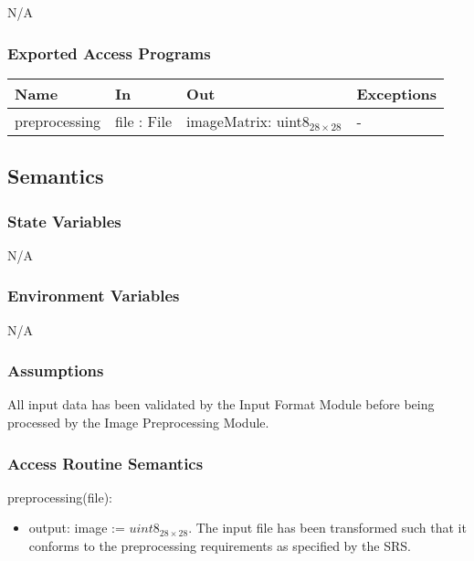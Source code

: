 \documentclass[12pt, titlepage]{article}
\begin{document}
N/A

\subsubsection{Exported Access Programs}

\begin{center}
\begin{tabular}{p{3cm} p{3cm} p{4cm} p{2cm}}
\hline
\textbf{Name} & \textbf{In} & \textbf{Out} & \textbf{Exceptions} \\
\hline
preprocessing & file : File & imageMatrix: uint8$_{28 \times 28}$ & - \\
\hline
\end{tabular}
\end{center}

\subsection{Semantics}

\subsubsection{State Variables}

N/A

\subsubsection{Environment Variables}

N/A

\subsubsection{Assumptions}

All input data has been validated by the Input Format Module before being
processed by the Image Preprocessing Module.

\subsubsection{Access Routine Semantics}

\noindent preprocessing(file):
\begin{itemize} 
\item output: image := $uint8_{28 \times 28}$.
The input file has been transformed such that it conforms to the preprocessing
requirements as specified by the SRS.
\end{itemize}
\end{document}
